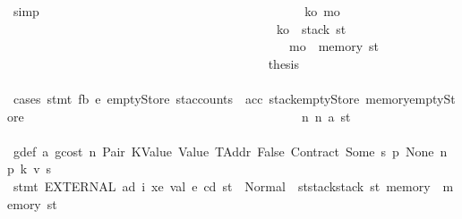 \begin{isabellebody}
\ simp\isanewline
\ \ \ \ \ \ \ \ \ \ \ \ \ \ \ \ \ \ \ \ \ \ \ \ \ \ \ \ \ \ \ \ \ \ \ \ \ \ \ \ \isamarkupfalse%
\ k\isactrlsub o\ m\isactrlsub o\isanewline
\ \ \ \ \ \ \ \ \ \ \ \ \ \ \ \ \ \ \ \ \ \ \ \ \ \ \ \ \ \ \ \ \ \ \ \ \ \ \ \ \ \ \ {\isachardoublequoteopen}k\isactrlsub o\ {\isacharequal}{\kern0pt}\ stack\ st{\isacharprime}{\kern0pt}{\isacharprime}{\kern0pt}{\isacharprime}{\kern0pt}{\isachardoublequoteclose}\isanewline
\ \ \ \ \ \ \ \ \ \ \ \ \ \ \ \ \ \ \ \ \ \ \ \ \ \ \ \ \ \ \ \ \ \ \ \ \ \ \ \ \ \ \ \ \ {\isachardoublequoteopen}m\isactrlsub o\ {\isacharequal}{\kern0pt}\ memory\ st{\isacharprime}{\kern0pt}{\isacharprime}{\kern0pt}{\isacharprime}{\kern0pt}{\isachardoublequoteclose}\isanewline
\ \ \ \ \ \ \ \ \ \ \ \ \ \ \ \ \ \ \ \ \ \ \ \ \ \ \ \ \ \ \ \ \ \ \ \ \ \ \ \ \isamarkupfalse%
\ {\isacharquery}{\kern0pt}thesis\isanewline
\ \ \ \ \ \ \ \ \ \ \ \ \ \ \ \ \ \ \ \ \ \ \ \ \ \ \ \ \ \ \ \ \ \ \ \ \ \ \ \ \isamarkupfalse%
\ {\isacharparenleft}{\kern0pt}cases\ {\isachardoublequoteopen}stmt\ fb\ e{\isacharprime}{\kern0pt}\ emptyStore\ {\isacharparenleft}{\kern0pt}st{\isacharprime}{\kern0pt}{\isacharprime}{\kern0pt}{\isacharprime}{\kern0pt}{\isasymlparr}accounts\ {\isacharcolon}{\kern0pt}{\isacharequal}{\kern0pt}\ acc{\isacharcomma}{\kern0pt}\ stack{\isacharcolon}{\kern0pt}{\isacharequal}{\kern0pt}emptyStore{\isacharcomma}{\kern0pt}\ memory{\isacharcolon}{\kern0pt}{\isacharequal}{\kern0pt}emptyStore{\isasymrparr}{\isacharparenright}{\kern0pt}{\isachardoublequoteclose}{\isacharparenright}{\kern0pt}\isanewline
\ \ \ \ \ \ \ \ \ \ \ \ \ \ \ \ \ \ \ \ \ \ \ \ \ \ \ \ \ \ \ \ \ \ \ \ \ \ \ \ \ \ \isamarkupfalse%
\ n{}{\isacharcolon}{\kern0pt}\ {\isacharparenleft}{\kern0pt}n\ a\ st{\isacharprime}{\kern0pt}{\isacharprime}{\kern0pt}{\isacharprime}{\kern0pt}{\isacharprime}{\kern0pt}{\isacharparenright}{\kern0pt}\isanewline
\ \ \ \ \ \ \ \ \ \ \ \ \ \ \ \ \ \ \ \ \ \ \ \ \ \ \ \ \ \ \ \ \ \ \ \ \ \ \ \ \ \ \isamarkupfalse%
\ g{\isacharunderscore}{\kern0pt}def\ a{}\ gcost\ n\ Pair\ KValue\ Value\ TAddr\ False\ Contract\ Some\ s{}\ p{}\ None\ n{}\ p{}\ k{}\ v\ s{}\isanewline
\ \ \ \ \ \ \ \ \ \ \ \ \ \ \ \ \ \ \ \ \ \ \ \ \ \ \ \ \ \ \ \ \ \ \ \ \ \ \ \ \ \ \isamarkupfalse%
\ {\isachardoublequoteopen}stmt\ {\isacharparenleft}{\kern0pt}EXTERNAL\ ad\ i\ xe\ val{\isacharparenright}{\kern0pt}\ e\ cd\ st\ {\isacharequal}{\kern0pt}\ Normal\ {\isacharparenleft}{\kern0pt}{\isacharparenleft}{\kern0pt}{\isacharparenright}{\kern0pt}{\isacharcomma}{\kern0pt}\ st{\isacharprime}{\kern0pt}{\isacharprime}{\kern0pt}{\isacharprime}{\kern0pt}{\isacharprime}{\kern0pt}{\isasymlparr}stack{\isacharcolon}{\kern0pt}{\isacharequal}{\kern0pt}stack\ st{\isacharprime}{\kern0pt}{\isacharprime}{\kern0pt}{\isacharprime}{\kern0pt}{\isacharcomma}{\kern0pt}\ memory\ {\isacharcolon}{\kern0pt}{\isacharequal}{\kern0pt}\ memory\ st{\isacharprime}{\kern0pt}{\isacharprime}{\kern0pt}{\isacharprime}{\kern0pt}{\isasymrparr}{\isacharparenright}{\kern0pt}{\isachardoublequoteclose}\isanewline

\end{isabellebody}
